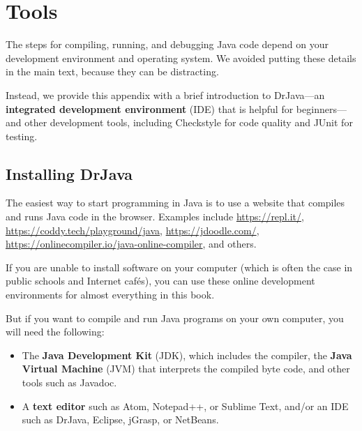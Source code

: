 \chapter{Tools}
\label{tools}


The steps for compiling, running, and debugging Java code depend on your development environment and operating system.
We avoided putting these details in the main text, because they can be distracting.

Instead, we provide this appendix with a brief introduction to DrJava---an {\bf integrated development environment} (IDE) that is helpful for beginners---and other development tools, including Checkstyle for code quality and JUnit for testing.


\section{Installing DrJava}
\label{drjava}

The easiest way to start programming in Java is to use a website that compiles and runs Java code in the browser.
Examples include \url{https://repl.it/}, \url{https://coddy.tech/playground/java}, \url{https://jdoodle.com/}, \url{https://onlinecompiler.io/java-online-compiler}, and others.

If you are unable to install software on your computer (which is often the case in public schools and Internet caf\'{e}s), you can use these online development environments for almost everything in this book.

But if you want to compile and run Java programs on your own computer, you will need the following:

\begin{itemize}

\item The {\bf Java Development Kit} (JDK), which includes the compiler, the {\bf Java Virtual Machine} (JVM) that interprets the compiled byte code, and other tools such as Javadoc.



\item A {\bf text editor} such as Atom, Notepad++, or Sublime Text, and/or an IDE such as DrJava, Eclipse, jGrasp, or NetBeans.

\end{itemize}

